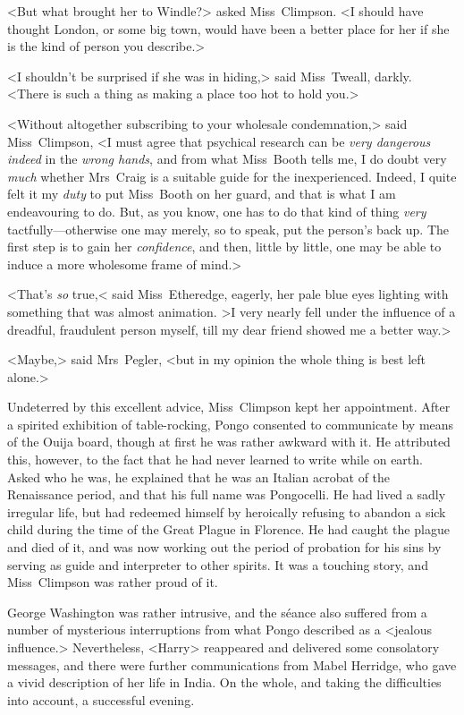 <But what brought her to Windle?> asked Miss~Climpson. <I should have thought London, or some big town, would have been a better place for her if she is the kind of person you describe.>

<I shouldn't be surprised if she was in hiding,> said Miss~Tweall, darkly. <There is such a thing as making a place too hot to hold you.>

<Without altogether subscribing to your wholesale condemnation,> said Miss~Climpson, <I must agree that psychical research can be \emph{very dangerous indeed} in the \emph{wrong hands}, and from what Miss~Booth tells me, I do doubt very \emph{much} whether Mrs~Craig is a suitable guide for the inexperienced. Indeed, I quite felt it my \emph{duty} to put Miss~Booth on her guard, and that is what I am endeavouring to do. But, as you know, one has to do that kind of thing \emph{very} tactfully—otherwise one may merely, so to speak, put the person's back up. The first step is to gain her \emph{confidence}, and then, little by little, one may be able to induce a more wholesome frame of mind.>

<That's \emph{so} true,< said Miss~Etheredge, eagerly, her pale blue eyes lighting with something that was almost animation. >I very nearly fell under the influence of a dreadful, fraudulent person myself, till my dear friend showed me a better way.>

<Maybe,> said Mrs~Pegler, <but in my opinion the whole thing is best left alone.>

Undeterred by this excellent advice, Miss~Climpson kept her appointment. After a spirited exhibition of table-rocking, Pongo consented to communicate by means of the Ouija board, though at first he was rather awkward with it. He attributed this, however, to the fact that he had never learned to write while on earth. Asked who he was, he explained that he was an Italian acrobat of the Renaissance period, and that his full name was Pongocelli. He had lived a sadly irregular life, but had redeemed himself by heroically refusing to abandon a sick child during the time of the Great Plague in Florence. He had caught the plague and died of it, and was now working out the period of probation for his sins by serving as guide and interpreter to other spirits. It was a touching story, and Miss~Climpson was rather proud of it.

George Washington was rather intrusive, and the séance also suffered from a number of mysterious interruptions from what Pongo described as a <jealous influence.> Nevertheless, <Harry> reappeared and delivered some consolatory messages, and there were further communications from Mabel Herridge, who gave a vivid description of her life in India. On the whole, and taking the difficulties into account, a successful evening.

